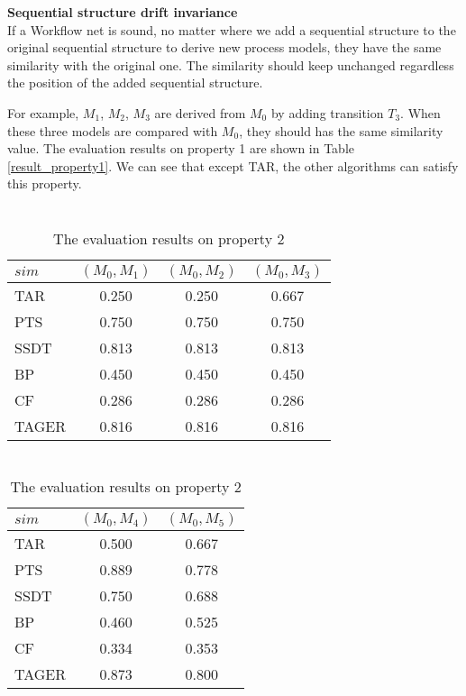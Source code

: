 \documentclass{llncs}
\begin{document}
\begin{property} 
\textbf{Sequential structure drift invariance}\\
If a Workflow net is sound, no matter where we add a sequential structure to the original sequential structure to derive new process models, they have the same similarity with the original one. The similarity should keep unchanged regardless the position of the added sequential structure.
\end{property} 
For example, $M_{1}$, $M_{2}$, $M_{3}$ are derived from $M_{0}$ by adding transition $T_{3}$. When these three models are compared with $M_{0}$, they should has the same similarity value. 
The evaluation results on property 1 are shown in Table \ref{result_property1}. We can see that except TAR, the other algorithms can satisfy this property.

\begin{table}[!htb]
\begin{minipage}[t]{0.5\linewidth} 
\centering
\caption{ \protect\\ The evaluation results on property 1  \label{result_property1}}
\begin{tabular}{l c c c} \hline
 $sim$  & $(M_{0},M_{1})$ & $(M_{0},M_{2})$ & $(M_{0},M_{3})$ \\ \hline
 TAR & 0.250 & 0.250 & 0.667 \\ 
 PTS & 0.750 & 0.750 & 0.750 \\ 
 SSDT& 0.813 & 0.813 & 0.813 \\ 
 BP & 0.450 & 0.450 & 0.450 \\ 
 CF & 0.286 & 0.286 & 0.286 \\ 
 TAGER& 0.816 & 0.816 & 0.816 \\ \hline
\end{tabular}
\end{minipage}
\begin{minipage}[t]{0.5\linewidth} 
\centering
\caption{ \protect\\ The evaluation results on property 2  \label{result_property2}}
\begin{tabular}{l c c} \hline
 $sim$  & $(M_{0},M_{4})$ & $(M_{0},M_{5})$  \\ \hline
 TAR & 0.500 & 0.667 \\ 
 PTS & 0.889 & 0.778  \\ 
 SSDT& 0.750 & 0.688 \\ 
 BP& 0.460 & 0.525 \\ 
 CF& 0.334 & 0.353 \\ 
 TAGER& 0.873 & 0.800 \\ \hline
\end{tabular}
\end{minipage}
\end{table}
\end{document}
